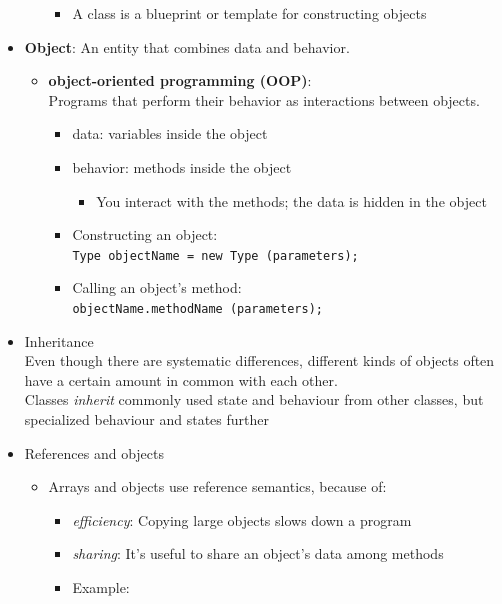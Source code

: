 \documentclass[a4paper]{article}
\newcommand{\inline}[1]{\lstinline!#1!}%
\begin{document}
\begin{itemize}
\begin{itemize}
\begin{itemize}
            \item A class is a blueprint or template for constructing objects
          \end{itemize}
      \end{itemize}
     \item \textbf{Object}: An entity that combines data and behavior.
     	\begin{itemize}
     		\item \textbf{object-oriented programming (OOP)}:\\Programs that perform their behavior as interactions between objects.
     			\begin{itemize}
     				\item data: variables inside the object
     				\item behavior: methods inside the object 
     					\begin{itemize}
     						\item You interact with the methods; the data is hidden in the object
     					\end{itemize}
     				\item Constructing an object:\\\inline{Type objectName = new Type (parameters);}
     				\item Calling an object's method:\\ \inline{objectName.methodName (parameters);}
     			\end{itemize}
     	\end{itemize}
     	\item Inheritance\\
     	Even though there are systematic differences, different kinds of objects often have a certain amount in common with each other.\\ Classes \textit{inherit} commonly used state and behaviour from other classes, but specialized behaviour and states further 
\item References and objects
	\begin{itemize}
		\item Arrays and objects use reference semantics, because of:
			\begin{itemize}
				\item \textit{efficiency}: Copying large objects slows down a program
				\item \textit{sharing}: It's useful to share an object's data among methods
				\item Example:
					\begin{lstlisting}

\end{lstlisting}
\end{itemize}
\end{itemize}
\end{itemize}
\end{document}
